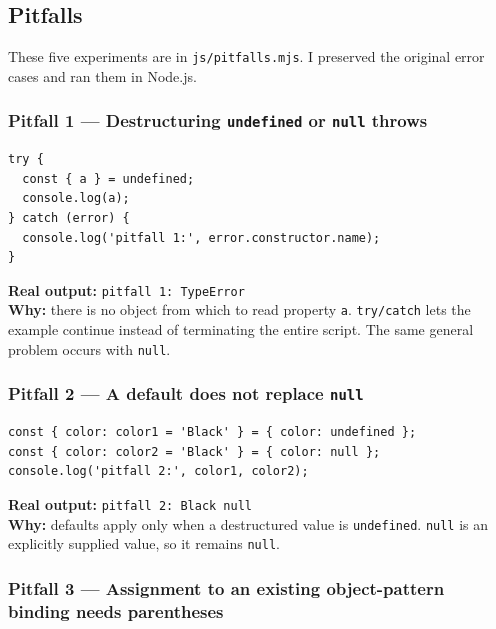 \documentclass[
  9pt,
]{article}
\newcommand{\passthrough}[1]{#1}
\begin{document}
\subsection{Pitfalls}\label{pitfalls}

These five experiments are in \passthrough{\lstinline!js/pitfalls.mjs!}.
I preserved the original error cases and ran them in Node.js.

\subsubsection{\texorpdfstring{Pitfall 1 --- Destructuring
\texttt{undefined} or \texttt{null}
throws}{Pitfall 1 --- Destructuring undefined or null throws}}\label{pitfall-1-destructuring-undefined-or-null-throws}

\begin{lstlisting}
try {
  const { a } = undefined;
  console.log(a);
} catch (error) {
  console.log('pitfall 1:', error.constructor.name);
}
\end{lstlisting}

\textbf{Real output:} \passthrough{\lstinline!pitfall 1: TypeError!}\\
\textbf{Why:} there is no object from which to read property
\passthrough{\lstinline!a!}. \passthrough{\lstinline!try/catch!} lets
the example continue instead of terminating the entire script. The same
general problem occurs with \passthrough{\lstinline!null!}.

\subsubsection{\texorpdfstring{Pitfall 2 --- A default does not replace
\texttt{null}}{Pitfall 2 --- A default does not replace null}}\label{pitfall-2-a-default-does-not-replace-null}

\begin{lstlisting}
const { color: color1 = 'Black' } = { color: undefined };
const { color: color2 = 'Black' } = { color: null };
console.log('pitfall 2:', color1, color2);
\end{lstlisting}

\textbf{Real output:} \passthrough{\lstinline!pitfall 2: Black null!}\\
\textbf{Why:} defaults apply only when a destructured value is
\passthrough{\lstinline!undefined!}. \passthrough{\lstinline!null!} is
an explicitly supplied value, so it remains
\passthrough{\lstinline!null!}.

\subsubsection{Pitfall 3 --- Assignment to an existing object-pattern
binding needs
parentheses}\label{pitfall-3-assignment-to-an-existing-object-pattern-binding-needs-parentheses}
\end{document}
